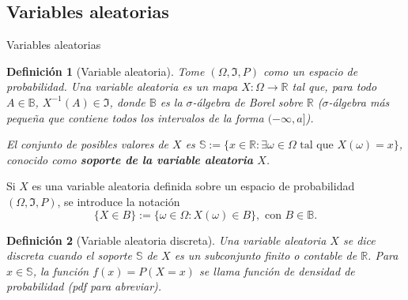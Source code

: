 \documentclass{beamer}
\newtheorem{defi}{Definición}[section]
\begin{document}
	\subsection{Variables aleatorias}
	\begin{frame}[allowframebreaks]{Variables aleatorias}
	\begin{defi}[Variable aleatoria]
	Tome $(\Omega, \Im, P)$ como un espacio de probabilidad. Una variable aleatoria es un mapa $X:\Omega\rightarrow \mathbb{R}$ tal que, para todo $A\in\mathbb{B}$, $X^{-1}(A)\in\Im$, donde $\mathbb{B}$ es la $\sigma$-álgebra de Borel sobre $\mathbb{R}$ ($\sigma$-álgebra más pequeña que contiene todos los intervalos de la forma $(-\infty, a]$).
	
		El conjunto de posibles valores de $X$ es $\mathbb{S}:=\{x\in\mathbb{R}:\exists \omega\in\Omega\text{ tal que }X(\omega)=x\}$, conocido como \textbf{soporte de la variable aleatoria }$X$.
	\end{defi}
	
	Si $X$ es una variable aleatoria definida sobre un  espacio de probabilidad $(\Omega, \Im, P)$, se introduce la notación
	$$\{X\in B\}:=\{\omega\in\Omega: X(\omega)\in B\}, \text{ con }B\in\mathbb{B}.$$
	
		\begin{defi}[Variable aleatoria discreta]
		Una variable aleatoria $X$ se dice discreta cuando el soporte $\mathbb{S}$ de $X$ es un subconjunto finito o contable de $\mathbb{R}$. Para $x\in\mathbb{S}$, la función $f(x)=P(X=x)$ se llama función de densidad de probabilidad (pdf para abreviar).
	\end{defi}
	

\end{frame}
\end{document}
